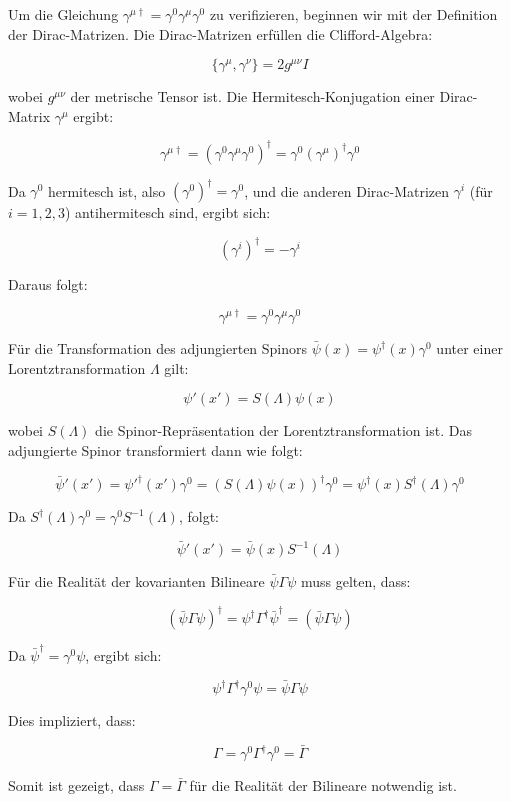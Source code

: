 Um die Gleichung $\gamma^{\mu \dagger} = \gamma^0 \gamma^\mu \gamma^0$ zu verifizieren, beginnen wir mit der Definition der Dirac-Matrizen. Die Dirac-Matrizen erfüllen die Clifford-Algebra:

\[
\{\gamma^\mu, \gamma^\nu\} = 2g^{\mu\nu}I
\]

wobei $g^{\mu\nu}$ der metrische Tensor ist. Die Hermitesch-Konjugation einer Dirac-Matrix $\gamma^\mu$ ergibt:

\[
\gamma^{\mu \dagger} = (\gamma^0 \gamma^\mu \gamma^0)^\dagger = \gamma^0 (\gamma^\mu)^\dagger \gamma^0
\]

Da $\gamma^0$ hermitesch ist, also $(\gamma^0)^\dagger = \gamma^0$, und die anderen Dirac-Matrizen $\gamma^i$ (für $i = 1, 2, 3$) antihermitesch sind, ergibt sich:

\[
(\gamma^i)^\dagger = -\gamma^i
\]

Daraus folgt:

\[
\gamma^{\mu \dagger} = \gamma^0 \gamma^\mu \gamma^0
\]

Für die Transformation des adjungierten Spinors $\bar{\psi}(x) = \psi^\dagger(x) \gamma^0$ unter einer Lorentztransformation $\Lambda$ gilt:

\[
\psi'(x') = S(\Lambda) \psi(x)
\]

wobei $S(\Lambda)$ die Spinor-Repräsentation der Lorentztransformation ist. Das adjungierte Spinor transformiert dann wie folgt:

\[
\bar{\psi}'(x') = \psi'^\dagger(x') \gamma^0 = \left(S(\Lambda) \psi(x)\right)^\dagger \gamma^0 = \psi^\dagger(x) S^\dagger(\Lambda) \gamma^0
\]

Da $S^\dagger(\Lambda) \gamma^0 = \gamma^0 S^{-1}(\Lambda)$, folgt:

\[
\bar{\psi}'(x') = \bar{\psi}(x) S^{-1}(\Lambda)
\]

Für die Realität der kovarianten Bilineare $\bar{\psi} \Gamma \psi$ muss gelten, dass:

\[
(\bar{\psi} \Gamma \psi)^\dagger = \psi^\dagger \Gamma^\dagger \bar{\psi}^\dagger = (\bar{\psi} \Gamma \psi)
\]

Da $\bar{\psi}^\dagger = \gamma^0 \psi$, ergibt sich:

\[
\psi^\dagger \Gamma^\dagger \gamma^0 \psi = \bar{\psi} \Gamma \psi
\]

Dies impliziert, dass:

\[
\Gamma = \gamma^0 \Gamma^\dagger \gamma^0 = \bar{\Gamma}
\]

Somit ist gezeigt, dass $\Gamma = \bar{\Gamma}$ für die Realität der Bilineare notwendig ist.